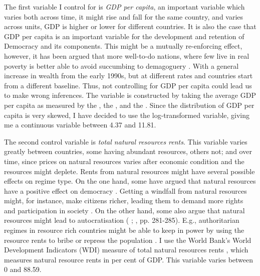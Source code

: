 The first variable I control for is \textit{GDP per capita}, an important variable which varies both across time, it might rise and fall for the same country, and varies across units, GDP is higher or lower for different countries. It is also the case that GDP per capita is an important variable for the development and retention of Democracy and its components. This might be a mutually re-enforcing effect, however, it has been argued that more well-to-do nations, where few live in real poverty is better able to avoid succumbing to demagoguery \citep[p. 75]{lipset_social_1959}. With a general increase in wealth from the early 1990s, but at different rates and countries start from a different baseline. Thus, not controlling for GDP per capita could lead us to make wrong inferences. The variable is constructed by taking the average GDP per capita as measured by the \citet{world_bank_world_2025}, the \citet{imf_world_2025}, and the \citet{united_nations_statistics_division_national_2025}. Since the distribution of GDP per capita is very skewed, I have decided to use the log-transformed variable, giving me a continuous variable between 4.37 and 11.81. 

The second control variable is \textit{total natural resources rents}. This variable varies greatly between countries, some having abundant resources, others not; and over time, since prices on natural resources varies after economic condition and the resources might deplete. Rents from natural resources might have several possible effects on regime type. On the one hand, some have argued that natural resources have a positive effect on democracy \citep{brooks_oil_2016, haber_natural_2011}. Getting a windfall from natural resources might, for instance, make citizens richer, leading them to demand more rights and participation in society \citep{brooks_oil_2016, lipset_social_1959}. On the other hand, some also argue that natural resources might lead to autocratisation (\citeauthor{andersen_big_2014} \citeyear{andersen_big_2014}; \citeauthor{brooks_oil_2016} \citeyear{brooks_oil_2016}, pp. 281-285). E.g., authoritarian regimes in resource rich countries might be able to keep in power by using the resource rents to bribe or repress the population \citep[p. 282]{brooks_oil_2016}. I use the World Bank's World Development Indicators (WDI) measure of total natural resources rents \citet{world_bank_world_2025}, which measures natural resource rents in per cent of GDP. This variable varies between 0 and 88.59. 

